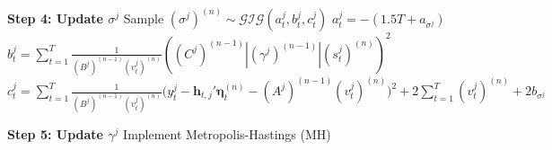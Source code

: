 \documentclass[APA,STIX1COL]{WileyNJD-v2}
\begin{document}
\begin{algorithm}
\begin{algorithmic}
        \State \textbf{Step 4: Update $\sigma^j$}
        \State Sample $(\sigma^j)^{(n)} \sim \mathcal{GIG}(a^j_t, b^j_t, c^j_t)$
        \State $a^j_t = -(1.5T + a_{\sigma^j})$
        \State $b^j_t = \sum_{t=1}^T \frac{1}{(B^j)^{(n-1)} (v^j_t)^{(n)}} \left((C^j)^{(n-1)} |(\gamma^j)^{(n-1)}| (s^j_t)^{(n)} \right)^2$
        \State $c^j_t = \sum_{t=1}^T \frac{1}{(B^j)^{(n-1)} (v^j_t)^{(n)}}\big(y_t^j -\mathbf{h}_{t,j}' \boldsymbol{\eta}^{(n)}_t - (A^j)^{(n-1)} (v^j_t)^{(n)}\big)^2 + 2 \sum_{t=1}^T  (v^j_t)^{(n)} + 2 b_{\sigma^j}$

        \State \textbf{Step 5: Update $\gamma^j$}
        \State Implement Metropolis-Hastings (MH)
    \EndFor
\EndFor

\end{algorithmic}
\end{algorithm}
\end{document}
